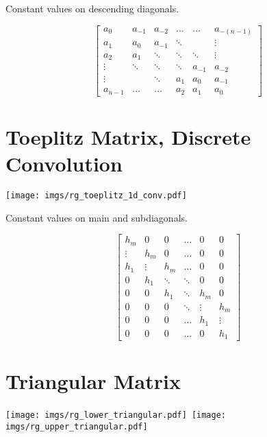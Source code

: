 Constant values on descending diagonals.

\begin{equation}
\begin{bmatrix}
  a_{0} & a_{-1} & a_{-2} & \ldots  & \ldots & a_{-(n-1)}  \\
  a_{1} & a_0    & a_{-1} & \ddots  &        & \vdots \\
  a_{2} & a_{1}  & \ddots & \ddots  & \ddots & \vdots \\ 
 \vdots & \ddots & \ddots & \ddots  & a_{-1} & a_{-2}\\
 \vdots &        & \ddots & a_{1}   & a_{0}  & a_{-1} \\
a_{n-1} & \ldots & \ldots & a_{2}   & a_{1}  & a_{0}
\end{bmatrix}
\end{equation}


\section{Toeplitz Matrix, Discrete Convolution}

\begin{center}
\texttt{[image: imgs/rg\_toeplitz\_1d\_conv.pdf]}
\end{center}

Constant values on main and subdiagonals.

\begin{equation}
\begin{bmatrix}
  h_m &   0 &   0 &      \hdots &   0 &   0 \\
  \vdots & h_m &   0 &   \hdots &   0 &   0 \\
  h_1 & \vdots & h_m &   \hdots &   0 &   0 \\
    0 & h_1 & \ddots & \ddots &   0 &   0 \\
    0 &   0 & h_1 &    \ddots & h_m &   0 \\
    0 &   0 &   0 &    \ddots & \vdots & h_m \\
    0 &   0 &   0 &      \hdots & h_1 & \vdots \\
    0 &   0 &   0 &      \hdots &   0 & h_1 
\end{bmatrix}
\end{equation}


\section{Triangular Matrix}

\begin{center}
\texttt{[image: imgs/rg\_lower\_triangular.pdf]}~\texttt{[image: imgs/rg\_upper\_triangular.pdf]}
\end{center}

